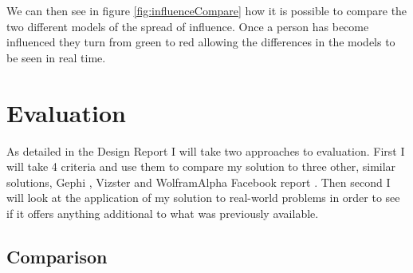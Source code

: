 \documentclass[12pt,a4paper]{article}
\begin{document}
We can then see in figure \ref{fig:influenceCompare} how it is possible to compare the two different models of the spread of influence. Once a person has become influenced they turn from green to red allowing the differences in the models to be seen in real time.

\section{Evaluation}

As detailed in the Design Report I will take two approaches to evaluation. First I will take 4 criteria and use them to compare my solution to three other, similar solutions, Gephi \cite{ICWSM09154}, Vizster \cite{heer2005vizster} and WolframAlpha Facebook report \cite{wolfram}. Then second I will look at the application of my solution to real-world problems in order to see if it offers anything additional to what was previously available.

\subsection{Comparison}
\end{document}
